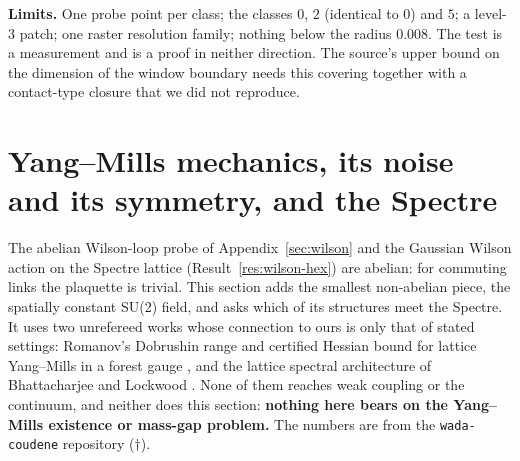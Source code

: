 \documentclass[11pt]{article}
\theoremstyle{definition}
\begin{document}
\textbf{Limits.} One probe point per class; the classes $0$, $2$ (identical to $0$) and $5$; a level-$3$ patch; one raster resolution family; nothing below the radius $0.008$. The test is a measurement and is a proof in neither direction. The source's upper bound on the dimension of the window boundary needs this covering together with a contact-type closure that we did not reproduce.


\section{Yang--Mills mechanics, its noise and its symmetry, and the Spectre}\label{sec:ym}
The abelian Wilson-loop probe of Appendix~\ref{sec:wilson} and the Gaussian Wilson action on the Spectre lattice (Result~\ref{res:wilson-hex}) are abelian: for commuting links the plaquette is trivial. This section adds the smallest non-abelian piece, the spatially constant SU(2) field, and asks which of its structures meet the Spectre. It uses two unrefereed works whose connection to ours is only that of stated settings: Romanov's Dobrushin range and certified Hessian bound for lattice Yang--Mills in a forest gauge \cite{romanov2026}, and the lattice spectral architecture of Bhattacharjee and Lockwood  \cite{bhattacharjee2026}. None of them reaches weak coupling or the continuum, and neither does this section: \textbf{nothing here bears on the Yang--Mills existence or mass-gap problem.} The numbers are from the \texttt{wada-coudene} repository ($\dagger$).
\end{document}
